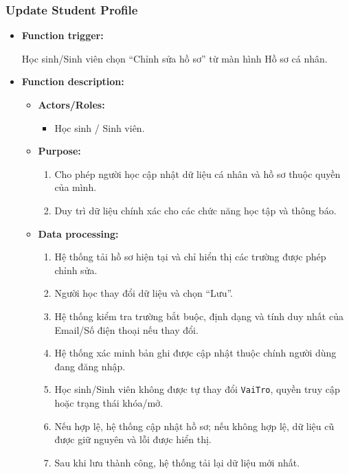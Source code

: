 \documentclass[12pt,a4paper,oneside]{report}
\begin{document}
\subsubsection{Update Student Profile}
\label{subsubsec:update-student-profile}

\begin{itemize}

    \item \textbf{Function trigger:}

    Học sinh/Sinh viên chọn ``Chỉnh sửa hồ sơ'' từ màn hình Hồ sơ cá nhân.

    \item \textbf{Function description:}

    \begin{itemize}

        \item \textbf{Actors/Roles:}
        \begin{itemize}
            \item Học sinh / Sinh viên.
        \end{itemize}

        \item \textbf{Purpose:}
        \begin{enumerate}
            \item Cho phép người học cập nhật dữ liệu cá nhân và hồ sơ thuộc quyền của mình.
            \item Duy trì dữ liệu chính xác cho các chức năng học tập và thông báo.
        \end{enumerate}

        \item \textbf{Data processing:}
        \begin{enumerate}
            \item Hệ thống tải hồ sơ hiện tại và chỉ hiển thị các trường được phép chỉnh sửa.
            \item Người học thay đổi dữ liệu và chọn ``Lưu''.
            \item Hệ thống kiểm tra trường bắt buộc, định dạng và tính duy nhất của Email/Số điện thoại nếu thay đổi.
            \item Hệ thống xác minh bản ghi được cập nhật thuộc chính người dùng đang đăng nhập.
            \item Học sinh/Sinh viên không được tự thay đổi \texttt{VaiTro}, quyền truy cập hoặc trạng thái khóa/mở.
            \item Nếu hợp lệ, hệ thống cập nhật hồ sơ; nếu không hợp lệ, dữ liệu cũ được giữ nguyên và lỗi được hiển thị.
            \item Sau khi lưu thành công, hệ thống tải lại dữ liệu mới nhất.
        \end{enumerate}


\end{itemize}
\end{itemize}
\end{document}
